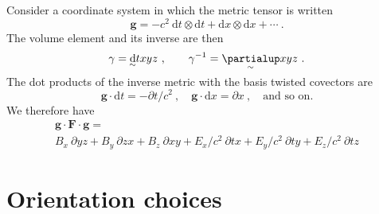 \documentclass[\ifafour a4paper,12pt,\else a5paper,10pt,\fi%
onecolumn,oneside,article,%
british%
]{memoir}
\theoremstyle{remark}
\theoremstyle{innote}
\newcommand*{\de}{\partialup}%
\newcommand*{\di}{\mathrm{d}}%
\renewcommand*{\|}[1][]{\nonscript\:#1\vert\nonscript\:\mathopen{}}
\newcommand*{\sect}{\S}%
\newcommand*{\tw}[2][\scriptstyle\sim]{\smash[b]{\underset{\mathclap{{}^{#1}}}{#2}}}
\newcommand*{\ti}[1][\scriptstyle\sim]{\tw[#1]{\di}}
\newcommand*{\te}[1][\scriptstyle\sim]{\tw[#1]{\de}}
\begin{document}
Consider a coordinate system in which the metric tensor is written
\begin{equation}
  \label{eq:metric}
  \bm{g} = -c^{2}\ \di t\otimes\di t + \di x\otimes\di x + \dotsb\ .
\end{equation}
The volume element \autocites[\sect~9.2]{portamana2019c_r2021} and its inverse are then
\begin{equation}
  \label{eq:vol_element}
  \gamma = \ti txyz \ , \qquad \gamma^{-1} = \te xyz \ .
\end{equation}
The dot products \autocites[\sect~267 p.~661]{truesdelletal1960} of the inverse metric with the basis twisted covectors are
\begin{equation}
  \label{eq:raised_covectors}
  \bm{g}\cdot\di t = -\de t/c^{2} \ ,\quad
  \bm{g}\cdot\di x = \de x \ ,\quad
  \text{and so on}.
\end{equation}
We therefore have
\begin{multline}
  \label{eq:raise_F}
  \bm{g}\cdot\bm{F}\cdot\bm{g} ={}\\
    B_{x}\ \de yz + B_{y}\ \de zx + B_{z}\ \de xy
  + E_{x}/c^{2}\ \de tx + E_{y}/c^{2}\ \de ty + E_{z}/c^{2}\ \de tz
\end{multline}

\iffalse
\section{Orientation choices}
\label{sec:orientation_choices}
\end{document}
